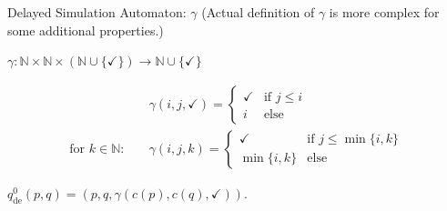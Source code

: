 \begin{frame}{Delayed Simulation Automaton: $\gamma$}
	(Actual definition of $\gamma$ is more complex for some additional properties.) \\
	
	\vspace{.5cm}
	
	$\gamma : \mathbb{N} \times \mathbb{N} \times (\mathbb{N} \cup \{\checkmark\}) \rightarrow \mathbb{N} \cup \{\checkmark\}$
	
	\begin{align*}
		& \gamma(i, j, \checkmark) = \begin{cases}
			\checkmark & \text{if } j \leq i \\
			i & \text{else}
		\end{cases} \\
		\text{for } k \in \mathbb{N}: \quad & \gamma(i, j, k) = \begin{cases}
			\checkmark & \text{if } j \leq \min \{i, k\} \\
			\min \{i, k\} & \text{else}
		\end{cases}
	\end{align*}
	
	\vspace{.5cm}
	
	$q_\text{de}^0(p, q) = (p, q, \gamma(c(p), c(q), \checkmark))$.
\end{frame}

%
%
%	
%	
%	


